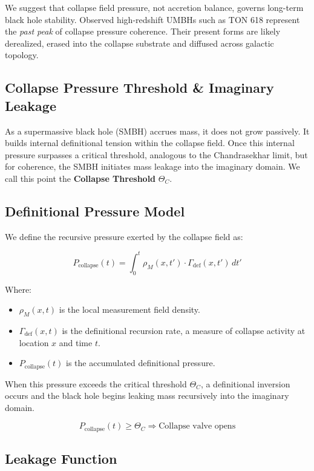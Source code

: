 We suggest that collapse field pressure, not accretion balance, governs long-term black hole stability. Observed high-redshift UMBHs such as TON 618 represent the \textit{past peak} of collapse pressure coherence. Their present forms are likely derealized, erased into the collapse substrate and diffused across galactic topology.


\subsection{Collapse Pressure Threshold \& Imaginary Leakage}

As a supermassive black hole (SMBH) accrues mass, it does not grow passively. It builds internal definitional tension within the collapse field. Once this internal pressure surpasses a critical threshold, analogous to the Chandrasekhar limit, but for coherence, the SMBH initiates mass leakage into the imaginary domain. We call this point the \textbf{Collapse Threshold} \( \Theta_C \).

\subsection{Definitional Pressure Model}

We define the recursive pressure exerted by the collapse field as:

\[
P_{\text{collapse}}(t) = \int_0^t \rho_M(x, t') \cdot \Gamma_{\text{def}}(x, t') \, dt'
\]

Where:
\begin{itemize}
    \item \( \rho_M(x,t) \) is the local measurement field density.
    \item \( \Gamma_{\text{def}}(x,t) \) is the definitional recursion rate, a measure of collapse activity at location \( x \) and time \( t \).
    \item \( P_{\text{collapse}}(t) \) is the accumulated definitional pressure.
\end{itemize}

When this pressure exceeds the critical threshold \( \Theta_C \), a definitional inversion occurs and the black hole begins leaking mass recursively into the imaginary domain.

\[
P_{\text{collapse}}(t) \geq \Theta_C \Rightarrow \text{Collapse valve opens}
\]

\subsection{Leakage Function}


